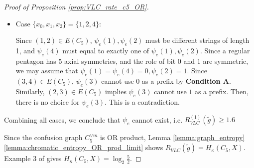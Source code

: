 \documentclass[journal, onecolumn, draftcls]{IEEEtran}
\theoremstyle{definition}
\newcommand{\meng}[1]{\marginpar{+}{\bf Ruoyu's remark}: {\em #1}}
\newcommand{\aditya}[1]{\marginpar{+}{\bf Aditya's remark}: {\em #1}}
\begin{document}
\begin{proof}[Proof of Proposition \ref{prop:VLC_rate_c5_OR}]
\begin{itemize}
\begin{itemize}
\end{itemize}
    \item  
Case $\{x_0,x_1,x_2\}=\{1,2,4\}$:

Since   $(1,2) \in E(C_5)$,  $\psi_e(1),\psi_e(2)$   must be different strings of length 1, and $\psi_e(4)$ must equal to exactly one of $\psi_e(1),\psi_e(2)$. Since a regular  pentagon has 5 axial symmetries, and the role of bit $0$ and $1$ are symmetric, we may assume that $\psi_e(1)=\psi_e(4)=0,\psi_e(2)=1$.  Since $(3,4)\in E(C_5)$, $\psi_e(3)$  cannot use $0$ as a prefix by \textbf{Condition A}. Similarly, $(2,3)\in E(C_5)$ implies $\psi_e(3)$  cannot use $1$ as a prefix. Then, there is no choice for $\psi_e(3)$. This is a contradiction.
\end{itemize}
 
Combining all cases, we conclude that $\psi_e$ cannot exist, i.e. $R_{VLC}^{(1)}(\tilde g) \ge 1.6$


Since  the confusion graph $C_5^{\lor m}$ is OR product, Lemma \ref{lemma:graph_entropy} \ref{lemma:chromatic_entropy_OR_prod_limit} shows  $R_{VLC}(\tilde g)=H_{\kappa}(C_5,X)$. Example 3 of \cite{AlonO_96} gives $H_{\kappa}(C_5,X) = \log_2 \frac{5}{2}$. 
\end{proof}
\end{document}

